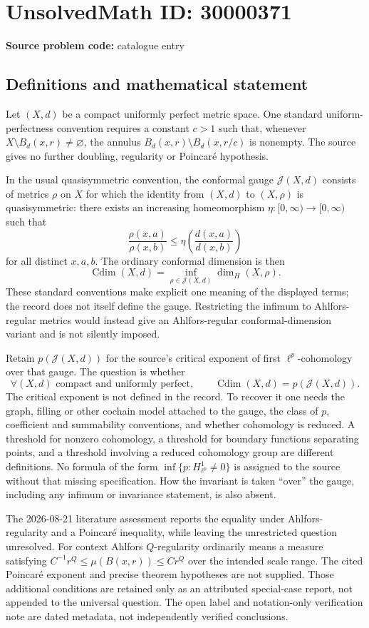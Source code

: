 \documentclass[11pt]{article}
\begin{document}
\section*{UnsolvedMath ID: 30000371}
\textbf{Source problem code:} catalogue entry
\subsection{Definitions and mathematical statement}
Let \((X,d)\) be a compact uniformly perfect metric space. One standard uniform-perfectness convention requires a constant \(c>1\) such that, whenever \(X\setminus B_d(x,r)\ne\varnothing\), the annulus \(B_d(x,r)\setminus B_d(x,r/c)\) is nonempty. The source gives no further doubling, regularity or Poincar\'e hypothesis.

In the usual quasisymmetric convention, the conformal gauge \(\mathcal J(X,d)\) consists of metrics \(\rho\) on \(X\) for which the identity from \((X,d)\) to \((X,\rho)\) is quasisymmetric: there exists an increasing homeomorphism \(\eta:[0,\infty)\to[0,\infty)\) such that
\[
 \frac{\rho(x,a)}{\rho(x,b)}\leq
 \eta\left(\frac{d(x,a)}{d(x,b)}\right)
\]
for all distinct \(x,a,b\). The ordinary conformal dimension is then
\[
 \operatorname{Cdim}(X,d)=\inf_{\rho\in\mathcal J(X,d)}\dim_H(X,\rho).
\]
These standard conventions make explicit one meaning of the displayed terms; the record does not itself define the gauge. Restricting the infimum to Ahlfors-regular metrics would instead give an Ahlfors-regular conformal-dimension variant and is not silently imposed.

Retain \(p(\mathcal J(X,d))\) for the source's critical exponent of first \(\ell^p\)-cohomology over that gauge. The question is whether
\[
 \forall (X,d)\text{ compact and uniformly perfect},\qquad
 \operatorname{Cdim}(X,d)=p(\mathcal J(X,d)).
\]
The critical exponent is not defined in the record. To recover it one needs the graph, filling or other cochain model attached to the gauge, the class of \(p\), coefficient and summability conventions, and whether cohomology is reduced. A threshold for nonzero cohomology, a threshold for boundary functions separating points, and a threshold involving a reduced cohomology group are different definitions. No formula of the form \(\inf\{p:H^1_{\ell^p}\ne0\}\) is assigned to the source without that missing specification. How the invariant is taken ``over'' the gauge, including any infimum or invariance statement, is also absent.

The 2026-08-21 literature assessment reports the equality under Ahlfors-regularity and a Poincar\'e inequality, while leaving the unrestricted question unresolved. For context Ahlfors \(Q\)-regularity ordinarily means a measure satisfying \(C^{-1}r^Q\leq\mu(B(x,r))\leq Cr^Q\) over the intended scale range. The cited Poincar\'e exponent and precise theorem hypotheses are not supplied. Those additional conditions are retained only as an attributed special-case report, not appended to the universal question. The open label and notation-only verification note are dated metadata, not independently verified conclusions.
\end{document}
